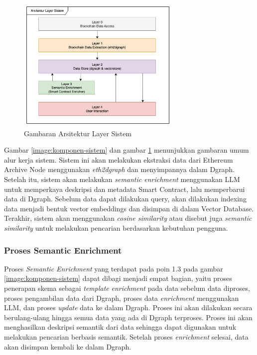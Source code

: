 \begin{figure}[ht]
	\centering
	\includegraphics[width=0.7\textwidth]{resources/chapter-3/layer-arsitektur-new.png}
	\caption{Gambaran Arsitektur Layer Sistem}
	\label{image:layer-arsitektur}
\end{figure}


Gambar \ref{image:komponen-sistem} dan gambar \ref{image:layer-arsitektur} menunjukkan gambaran umum alur kerja sistem. Sistem ini akan melakukan ekstraksi data dari Ethereum Archive Node menggunakan \textit{eth2dgraph} dan menyimpannya dalam Dgraph. Setelah itu, sistem akan melakukan \textit{semantic enrichment} menggunakan LLM untuk memperkaya deskripsi dan metadata Smart Contract, lalu memperbarui data di Dgraph. Sebelum data dapat dilakukan query, akan dilakukan indexing data menjadi bentuk vector embeddings dan disimpan di dalam Vector Database. Terakhir, sistem akan menggunakan \textit{cosine similarity} atau disebut juga \textit{semantic similarity} untuk melakukan pencarian berdasarkan kebutuhan pengguna.

\subsubsection{Proses Semantic Enrichment}

Proses \textit{Semantic Enrichment} yang terdapat pada poin 1.3 pada gambar \ref{image:komponen-sistem} dapat dibagi menjadi empat bagian, yaitu proses penerapan skema sebagai \textit{template} \textit{enrichment} pada data sebelum data diproses, proses pengambilan data dari Dgraph, proses data \textit{enrichment} menggunakan LLM, dan proses \textit{update} data ke dalam Dgraph.
Proses ini akan dilakukan secara berulang-ulang hingga semua data yang ada di Dgraph terproses. Proses ini akan menghasilkan deskripsi semantik dari data sehingga dapat digunakan untuk melakukan pencarian berbasis semantik. Setelah proses \textit{enrichment} selesai, data akan disimpan kembali ke dalam Dgraph.

